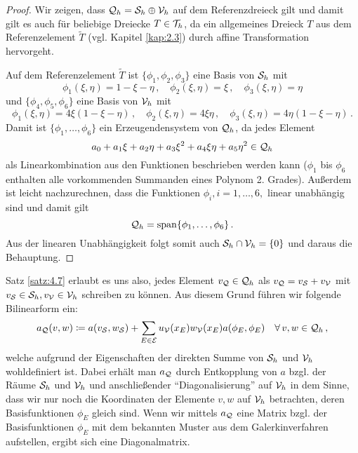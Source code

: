 \begin{proof}
Wir zeigen, dass $\mathcal Q_h = \mathcal S_h \oplus \mathcal V_h$ auf dem Referenzdreieck gilt und damit gilt es auch für beliebige Dreiecke $T \in \mathcal T_h$, da ein allgemeines Dreieck $T$ aus dem Referenzelement $\widetilde T$ (vgl. Kapitel \ref{kap:2.3}) durch affine Transformation hervorgeht.

Auf dem Referenzelement $\widetilde T$ ist $\{\phi_1,\phi_2,\phi_3\}$ eine Basis von $\mathcal S_h$ mit
\[
	\phi_1(\xi,\eta) = 1-\xi-\eta \, , \quad \phi_2(\xi,\eta) = \xi \, , \quad \phi_3(\xi,\eta) = \eta
\]
und $\{\phi_4,\phi_5,\phi_6\}$ eine Basis von $\mathcal V_h$ mit
\[
	\phi_1(\xi,\eta) = 4\xi (1-\xi-\eta) \, , \quad \phi_2(\xi,\eta) = 4\xi\eta \, , \quad \phi_3(\xi,\eta) = 4\eta(1-\xi-\eta) \, .
\]
Damit ist $\{\phi_1,\ldots,\phi_6\}$ ein Erzeugendensystem von $\mathcal Q_h$, da jedes Element
\[
	a_0+a_1\xi+a_2\eta + a_3 \xi^2+ a_4\xi\eta +a_5\eta^2 \in \mathcal Q_h
\]
als Linearkombination aus den Funktionen beschrieben werden kann ($\phi_1$ bis $\phi_6$ enthalten alle vorkommenden Summanden eines Polynom 2. Grades). Außerdem ist leicht nachzurechnen, dass die Funktionen $\phi_i,i = 1,\ldots,6,$ linear unabhängig sind und damit gilt
\[
	\mathcal Q_h = \operatorname{span} \{\phi_1,\ldots,\phi_6\} \, .
\]
Aus der linearen Unabhängigkeit folgt somit auch $\mathcal S_h \cap \mathcal V_h = \{0\}$  und daraus die Behauptung.
\end{proof}

Satz \ref{satz:4.7} erlaubt es uns also, jedes Element $v_{\mathcal Q} \in \mathcal Q_h$  als $v_{\mathcal Q} = v_{\mathcal S} + v_{\mathcal V}$ mit $v_{\mathcal S} \in \mathcal S_h, v_{\mathcal V}\in \mathcal V_h$ schreiben zu können. Aus diesem Grund führen wir folgende Bilinearform ein:
\begin{align*}
	a_{\mathcal Q} (v,w) \coloneqq a(v_{\mathcal S},w_{\mathcal S}) + \sum_{E \in \mathcal E} u_{\mathcal V}(x_E) w_{\mathcal V}(x_E) a(\phi_E,\phi_E) \quad \forall \, v,w \in \mathcal Q_h \, ,
\end{align*}
welche aufgrund der Eigenschaften der direkten Summe von $\mathcal S_h$ und $\mathcal V_h$ wohldefiniert ist. Dabei erhält man $a_{\mathcal Q}$ durch Entkopplung von $a$ bzgl. der Räume $\mathcal S_h$ und $\mathcal V_h$ und anschließender "`Diagonalisierung"' auf $\mathcal V_h$ in dem Sinne, dass wir nur noch die Koordinaten der Elemente $v,w$ auf $\mathcal V_h$ betrachten, deren Basisfunktionen $\phi_E$ gleich sind. Wenn wir mittels $a_{\mathcal Q}$ eine Matrix bzgl. der Basisfunktionen $\phi_E$ mit dem bekannten Muster aus dem Galerkinverfahren aufstellen, ergibt sich eine Diagonalmatrix.

